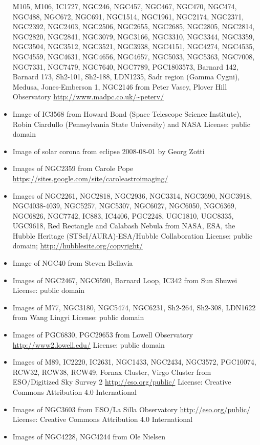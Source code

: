 \begin{itemize}
	 M105, M106, IC1727, NGC246, NGC457, NGC467,
	 NGC470, NGC474, NGC488, NGC672, NGC691, NGC1514, NGC1961,
	 NGC2174, NGC2371, NGC2392, NGC2403, NGC2506, NGC2655, NGC2685,
	 NGC2805, NGC2814, NGC2820, NGC2841, NGC3079, NGC3166,
	 NGC3310, NGC3344, NGC3359, NGC3504, NGC3512, NGC3521,
	 NGC3938, NGC4151, NGC4274, NGC4535, NGC4559, NGC4631, NGC4656,
	 NGC4657, NGC5033, NGC5363, NGC7008, NGC7331, NGC7479,
	 NGC7640, NGC7789, PGC1803573, Barnard 142, Barnard 173,
	 Sh2-101, Sh2-188, LDN1235, Sadr region (Gamma Cygni), Medusa,
	 Jones-Emberson 1, NGC2146
	 from Peter Vasey, Plover Hill Observatory
	 \url{http://www.madpc.co.uk/~peterv/}
\item Image of IC3568 from Howard Bond (Space Telescope Science Institute), Robin Ciardullo (Pennsylvania State University) and NASA
	 License: public domain
\item Image of solar corona from eclipse 2008-08-01 by Georg Zotti
\item Images of NGC2359 from Carole Pope
	 \url{https://sites.google.com/site/caroleastroimaging/}
\item Images of NGC2261, NGC2818, NGC2936, NGC3314, NGC3690, NGC3918,
	 NGC4038-4039, NGC5257, NGC5307, NGC6027, NGC6050, NGC6369, NGC6826, NGC7742, IC883,
	 IC4406, PGC2248, UGC1810, UGC8335, UGC9618, Red Rectangle and Calabash Nebula
	 from NASA, ESA, the Hubble Heritage (STScI/AURA)-ESA/Hubble
	 Collaboration
	 License: public domain; \url{http://hubblesite.org/copyright/}
\item Image of NGC40 from Steven Bellavia
\item Images of NGC2467, NGC6590, Barnard Loop, IC342
	 from Sun Shuwei
	 License: public domain
\item Images of M77, NGC3180, NGC5474, NGC6231, Sh2-264, Sh2-308, LDN1622
	 from Wang Lingyi
	 License: public domain
\item Images of PGC6830, PGC29653 from Lowell Observatory
	 \url{http://www2.lowell.edu/}
	 License: public domain
\item Images of M89, IC2220, IC2631, NGC1433, NGC2434, NGC3572, PGC10074,	 
	 RCW32, RCW38, RCW49, Fornax Cluster, Virgo Cluster
	 from ESO/Digitized Sky Survey 2
	 \url{http://eso.org/public/}
	 License: Creative Commons Attribution 4.0 International 
\item Images of NGC3603 
from ESO/La Silla Observatory
	 \url{http://eso.org/public/}
	 License: Creative Commons Attribution 4.0 International 
\item Images of NGC4228, NGC4244
	 from Ole Nielsen

\end{itemize}
